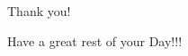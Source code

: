 \documentclass{beamer}
\begin{document}
\begin{frame}{Thank you!}
	\begin{center}
        Have a great rest of your Day!!!
	\end{center}
	\begin{center}
	\end{center}
\end{frame}
\end{document}
